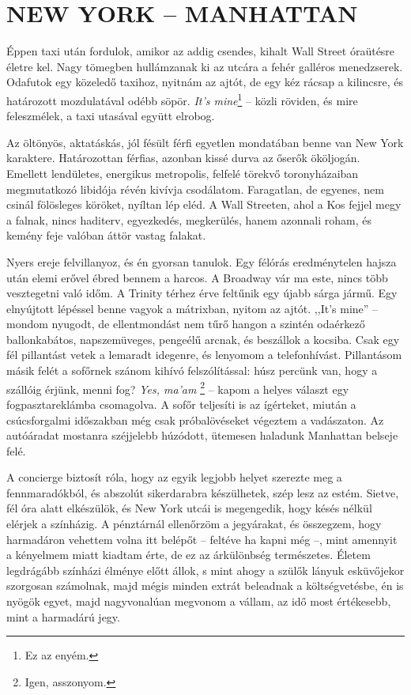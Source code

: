 \clearpage
\chapter{NEW YORK -- MANHATTAN}

Éppen taxi után fordulok, amikor az addig csendes, kihalt Wall Street
óraütésre életre kel. Nagy tömegben hullámzanak ki az utcára a fehér
galléros menedzserek. Odafutok egy közeledő taxihoz, nyitnám az ajtót,
de egy kéz rácsap a kilincsre, és határozott mozdulatával odébb
söpör. \textit{It's mine}\footnote{Ez az enyém.} -- közli röviden,
és mire feleszmélek, a taxi utasával együtt elrobog.

Az öltönyös, aktatáskás, jól fésült férfi egyetlen mondatában benne
van New York karaktere. Határozottan férfias, azonban kissé durva
az őserők ököljogán. Emellett lendületes, energikus metropolis, felfelé
törekvő toronyházaiban megmutatkozó libidója révén kivívja csodálatom.
Faragatlan, de egyenes, nem csinál fölösleges köröket, nyíltan lép
eléd. A Wall Streeten, ahol a Kos fejjel megy a falnak, nincs haditerv,
egyezkedés, megkerülés, hanem azonnali roham, és kemény feje valóban
áttör vastag falakat.

Nyers ereje felvillanyoz, és én gyorsan tanulok. Egy félórás eredménytelen
hajsza után elemi erővel ébred bennem a harcos. A Broadway
vár ma este, nincs több vesztegetni való időm. A Trinity térhez
érve feltűnik egy újabb sárga jármű. Egy elnyújtott lépéssel benne
vagyok a mátrixban, nyitom az ajtót. ,,It's mine'' -- mondom nyugodt, de
ellentmondást nem tűrő hangon a szintén odaérkező ballonkabátos,
napszemüveges, pengeélű arcnak, és beszállok a kocsiba. Csak egy
fél pillantást vetek a lemaradt idegenre, és lenyomom a telefonhívást.
Pillantásom másik felét a sofőrnek szánom kihívó felszólítással: húsz
percünk van, hogy a szállóig érjünk, menni fog? \textit{Yes, ma'am}%
\footnote{Igen, asszonyom.} -- kapom a
helyes választ egy fogpasztareklámba csomagolva. A sofőr teljesíti is az
ígérteket, miután a csúcsforgalmi időszakban még csak próbalövéseket
végeztem a vadászaton. Az autóáradat mostanra széjjelebb húzódott,
ütemesen haladunk Manhattan belseje felé.

A concierge biztosít róla, hogy az egyik legjobb helyet szerezte meg
a fennmaradókból, és abszolút sikerdarabra készülhetek, szép lesz az
estém. Sietve, fél óra alatt elkészülök, és New York utcái is megengedik,
hogy késés nélkül elérjek a színházig. A pénztárnál ellenőrzöm a
jegyárakat, és összegzem, hogy harmadáron vehettem volna itt belépőt
-- feltéve ha kapni még --, mint amennyit a kényelmem miatt kiadtam
érte, de ez az árkülönbség természetes. Életem legdrágább színházi élménye
előtt állok, s mint ahogy a szülők lányuk esküvőjekor szorgosan
számolnak, majd mégis minden extrát beleadnak a költségvetésbe, én
is nyögök egyet, majd nagyvonalúan megvonom a vállam, az idő most
értékesebb, mint a harmadárú jegy.

